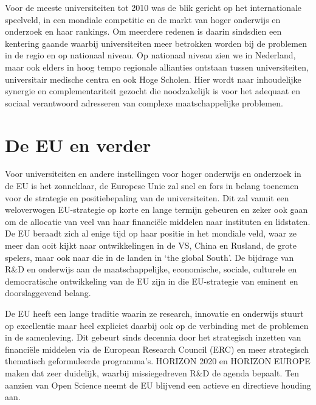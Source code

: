 \documentclass[empirical, authordate, ]{new-jote-article}
\begin{document}
	Voor de meeste universiteiten tot 2010 was de blik gericht op het internationale speelveld, in een mondiale competitie en de markt van hoger onderwijs en onderzoek en haar rankings. Om meerdere redenen is daarin sindsdien een kentering gaande waarbij universiteiten meer betrokken worden bij de problemen in de regio en op nationaal niveau. Op nationaal niveau zien we in Nederland, maar ook elders in hoog tempo regionale allianties ontstaan tussen universiteiten, universitair medische centra en ook Hoge Scholen. Hier wordt naar inhoudelijke synergie en complementariteit gezocht die noodzakelijk is voor het adequaat en sociaal verantwoord adresseren van complexe maatschappelijke problemen.



	\section{De EU en verder }



	Voor universiteiten en andere instellingen voor hoger onderwijs en onderzoek in de EU is het zonneklaar, de Europese Unie zal snel en fors in belang toenemen voor de strategie en positiebepaling van de universiteiten. Dit zal vanuit een weloverwogen EU-strategie op korte en lange termijn gebeuren en zeker ook gaan om de allocatie van veel van haar financiële middelen naar instituten en lidstaten. De EU beraadt zich al enige tijd op haar positie in het mondiale veld, waar ze meer dan ooit kijkt naar ontwikkelingen in de VS, China en Rusland, de grote spelers, maar ook naar die in de landen in ‘the global South'. De bijdrage van R\&D en onderwijs aan de maatschappelijke, economische, sociale, culturele en democratische ontwikkeling van de EU zijn in die EU-strategie van eminent en doorslaggevend belang.



	De EU heeft een lange traditie waarin ze research, innovatie en onderwijs stuurt op excellentie maar heel expliciet daarbij ook op de verbinding met de problemen in de samenleving. Dit gebeurt sinds decennia door het strategisch inzetten van financiële middelen via de European Research Council (ERC) en meer strategisch thematisch geformuleerde programma's. HORIZON 2020 en HORIZON EUROPE maken dat zeer duidelijk, waarbij missiegedreven R\&D de agenda bepaalt. Ten aanzien van Open Science neemt de EU blijvend een actieve en directieve houding aan.
\end{document}
